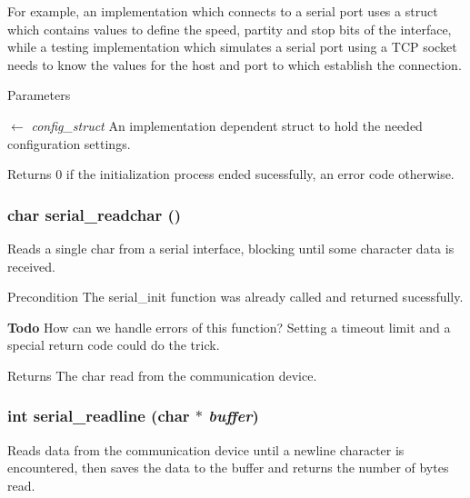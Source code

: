 For example, an implementation which connects to a serial port uses a struct which contains values to define the speed, partity and stop bits of the interface, while a testing implementation which simulates a serial port using a TCP socket needs to know the values for the host and port to which establish the connection.


\begin{DoxyParams}{Parameters}
\item[\mbox{$\leftarrow$} {\em config\_\-struct}]An implementation dependent struct to hold the needed configuration settings. \end{DoxyParams}
\begin{DoxyReturn}{Returns}
0 if the initialization process ended sucessfully, an error code otherwise. 
\end{DoxyReturn}
\subsubsection[{serial\_\-readchar}]{\setlength{\rightskip}{0pt plus 5cm}char serial\_\-readchar ()}\label{db/d11/serial_8h_a4650ddb52ffe6a8395efb315ee5fa286}
Reads a single char from a serial interface, blocking until some character data is received.

\begin{DoxyPrecond}{Precondition}
The {\ttfamily serial\_\-init} function was already called and returned sucessfully. 
\end{DoxyPrecond}
\begin{Desc}
\item[{\bf Todo}]How can we handle errors of this function? Setting a timeout limit and a special return code could do the trick.\end{Desc}
\begin{DoxyReturn}{Returns}
The char read from the communication device. 
\end{DoxyReturn}
\subsubsection[{serial\_\-readline}]{\setlength{\rightskip}{0pt plus 5cm}int serial\_\-readline (char $\ast$ {\em buffer})}\label{db/d11/serial_8h_abd6ad4a121321105cea5607b5009ff6e}
Reads data from the communication device until a newline character is encountered, then saves the data to the buffer and returns the number of bytes read.

